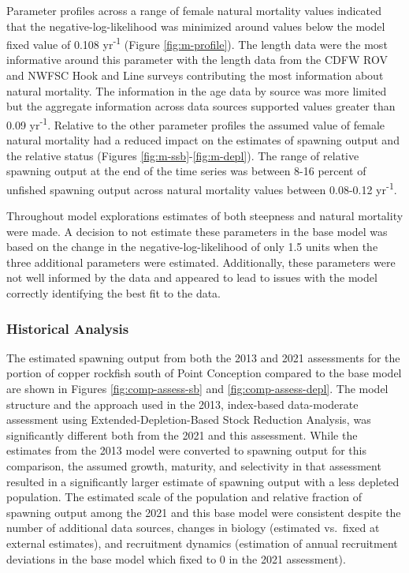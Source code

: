 \documentclass[11pt,
  english,
  letterpaper,
]{article}
\begin{document}
Parameter profiles across a range of female natural mortality values indicated that the negative-log-likelihood was minimized around values below the model fixed value of 0.108 yr\textsuperscript{-1} (Figure \ref{fig:m-profile}). The length data were the most informative around this parameter with the length data from the CDFW ROV and NWFSC Hook and Line surveys contributing the most information about natural mortality. The information in the age data by source was more limited but the aggregate information across data sources supported values greater than 0.09 yr\textsuperscript{-1}. Relative to the other parameter profiles the assumed value of female natural mortality had a reduced impact on the estimates of spawning output and the relative status (Figures \ref{fig:m-ssb}-\ref{fig:m-depl}). The range of relative spawning output at the end of the time series was between 8-16 percent of unfished spawning output across natural mortality values between 0.08-0.12 yr\textsuperscript{-1}.

Throughout model explorations estimates of both steepness and natural mortality were made. A decision to not estimate these parameters in the base model was based on the change in the negative-log-likelihood of only 1.5 units when the three additional parameters were estimated. Additionally, these parameters were not well informed by the data and appeared to lead to issues with the model correctly identifying the best fit to the data.

\hypertarget{historical-analysis}{%
\subsubsection{Historical Analysis}\label{historical-analysis}}

The estimated spawning output from both the 2013 and 2021 assessments for the portion of copper rockfish south of Point Conception compared to the base model are shown in Figures \ref{fig:comp-assess-sb} and \ref{fig:comp-assess-depl}. The model structure and the approach used in the 2013, index-based data-moderate assessment using Extended-Depletion-Based Stock Reduction Analysis, was significantly different both from the 2021 and this assessment. While the estimates from the 2013 model were converted to spawning output for this comparison, the assumed growth, maturity, and selectivity in that assessment resulted in a significantly larger estimate of spawning output with a less depleted population. The estimated scale of the population and relative fraction of spawning output among the 2021 and this base model were consistent despite the number of additional data sources, changes in biology (estimated vs.~fixed at external estimates), and recruitment dynamics (estimation of annual recruitment deviations in the base model which fixed to 0 in the 2021 assessment).
\end{document}

